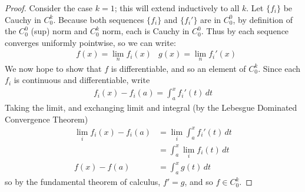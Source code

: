      \begin{proof}
        Consider the case $k=1$; this will extend inductively to all $k$.
        Let $\{f_i\}$ be Cauchy in $C^k_0$.
        Because both sequences $\{f_i\}$ and $\{f_i'\}$ are in $C^0_0$, by definition of the $C^0_0$ (sup) norm and $C^k_0$ norm, each is Cauchy in $C^0_0$.
        Thus by  each sequence converges uniformly pointwise, so we can write:
        \begin{align*}
          &f(x)=\lim_n f_i(x) &g(x)=\lim_n f_i'(x)
        \end{align*}
        We now hope to show that $f$ is differentiable, and so an element of $C^k_0$.
        Since each $f_i$ is continuous and differentiable, write
        \begin{align*}
          f_i(x)-f_i(a) = \int_a^x f_i'(t)\,dt
        \end{align*}
        Taking the limit, and exchanging limit and integral (by the Lebesgue Dominated Convergence Theorem)
        \begin{align*}
          \lim_i f_i(x)-f_i(a) &= \lim_i\int_a^x f_i'(t)\,dt\\
          &= \int_a^x\lim_if_i(t)\,dt\\
          f(x)-f(a) &= \int_a^x g(t)\,dt
        \end{align*}
        so by the fundamental theorem of calculus, $f'=g$, and so $f\in C^k_0$.
      \end{proof}

